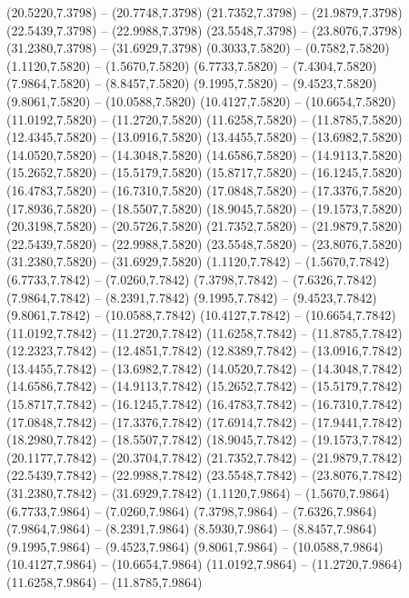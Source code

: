 {\begin{scope}[shift={(#1,#2)}]
    (20.5220,7.3798) -- (20.7748,7.3798)
    (21.7352,7.3798) -- (21.9879,7.3798)
    (22.5439,7.3798) -- (22.9988,7.3798)
    (23.5548,7.3798) -- (23.8076,7.3798)
    (31.2380,7.3798) -- (31.6929,7.3798)
    (0.3033,7.5820) -- (0.7582,7.5820)
    (1.1120,7.5820) -- (1.5670,7.5820)
    (6.7733,7.5820) -- (7.4304,7.5820)
    (7.9864,7.5820) -- (8.8457,7.5820)
    (9.1995,7.5820) -- (9.4523,7.5820)
    (9.8061,7.5820) -- (10.0588,7.5820)
    (10.4127,7.5820) -- (10.6654,7.5820)
    (11.0192,7.5820) -- (11.2720,7.5820)
    (11.6258,7.5820) -- (11.8785,7.5820)
    (12.4345,7.5820) -- (13.0916,7.5820)
    (13.4455,7.5820) -- (13.6982,7.5820)
    (14.0520,7.5820) -- (14.3048,7.5820)
    (14.6586,7.5820) -- (14.9113,7.5820)
    (15.2652,7.5820) -- (15.5179,7.5820)
    (15.8717,7.5820) -- (16.1245,7.5820)
    (16.4783,7.5820) -- (16.7310,7.5820)
    (17.0848,7.5820) -- (17.3376,7.5820)
    (17.8936,7.5820) -- (18.5507,7.5820)
    (18.9045,7.5820) -- (19.1573,7.5820)
    (20.3198,7.5820) -- (20.5726,7.5820)
    (21.7352,7.5820) -- (21.9879,7.5820)
    (22.5439,7.5820) -- (22.9988,7.5820)
    (23.5548,7.5820) -- (23.8076,7.5820)
    (31.2380,7.5820) -- (31.6929,7.5820)
    (1.1120,7.7842) -- (1.5670,7.7842)
    (6.7733,7.7842) -- (7.0260,7.7842)
    (7.3798,7.7842) -- (7.6326,7.7842)
    (7.9864,7.7842) -- (8.2391,7.7842)
    (9.1995,7.7842) -- (9.4523,7.7842)
    (9.8061,7.7842) -- (10.0588,7.7842)
    (10.4127,7.7842) -- (10.6654,7.7842)
    (11.0192,7.7842) -- (11.2720,7.7842)
    (11.6258,7.7842) -- (11.8785,7.7842)
    (12.2323,7.7842) -- (12.4851,7.7842)
    (12.8389,7.7842) -- (13.0916,7.7842)
    (13.4455,7.7842) -- (13.6982,7.7842)
    (14.0520,7.7842) -- (14.3048,7.7842)
    (14.6586,7.7842) -- (14.9113,7.7842)
    (15.2652,7.7842) -- (15.5179,7.7842)
    (15.8717,7.7842) -- (16.1245,7.7842)
    (16.4783,7.7842) -- (16.7310,7.7842)
    (17.0848,7.7842) -- (17.3376,7.7842)
    (17.6914,7.7842) -- (17.9441,7.7842)
    (18.2980,7.7842) -- (18.5507,7.7842)
    (18.9045,7.7842) -- (19.1573,7.7842)
    (20.1177,7.7842) -- (20.3704,7.7842)
    (21.7352,7.7842) -- (21.9879,7.7842)
    (22.5439,7.7842) -- (22.9988,7.7842)
    (23.5548,7.7842) -- (23.8076,7.7842)
    (31.2380,7.7842) -- (31.6929,7.7842)
    (1.1120,7.9864) -- (1.5670,7.9864)
    (6.7733,7.9864) -- (7.0260,7.9864)
    (7.3798,7.9864) -- (7.6326,7.9864)
    (7.9864,7.9864) -- (8.2391,7.9864)
    (8.5930,7.9864) -- (8.8457,7.9864)
    (9.1995,7.9864) -- (9.4523,7.9864)
    (9.8061,7.9864) -- (10.0588,7.9864)
    (10.4127,7.9864) -- (10.6654,7.9864)
    (11.0192,7.9864) -- (11.2720,7.9864)
    (11.6258,7.9864) -- (11.8785,7.9864)

\end{scope}}
